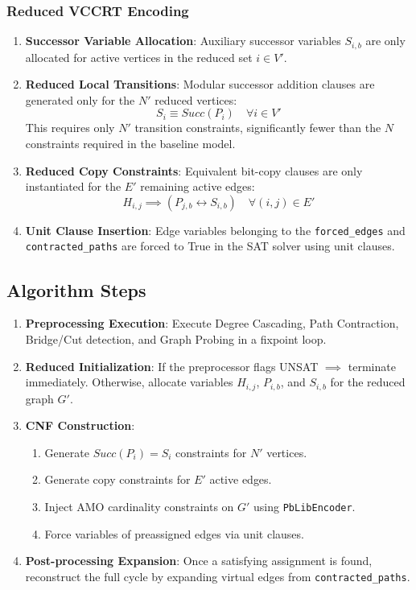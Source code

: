 \subsubsection{Reduced VCCRT Encoding}
\begin{enumerate}
    \item \textbf{Successor Variable Allocation}: Auxiliary successor variables $S_{i,b}$ are only allocated for active vertices in the reduced set $i \in V'$.
    \item \textbf{Reduced Local Transitions}: Modular successor addition clauses are generated only for the $N'$ reduced vertices:
    \begin{equation}
        S_i \equiv Succ(P_i) \quad \forall i \in V'
    \end{equation}
    This requires only $N'$ transition constraints, significantly fewer than the $N$ constraints required in the baseline model.
    \item \textbf{Reduced Copy Constraints}: Equivalent bit-copy clauses are only instantiated for the $E'$ remaining active edges:
    \begin{equation}
        H_{i,j} \implies (P_{j,b} \leftrightarrow S_{i,b}) \quad \forall (i,j) \in E'
    \end{equation}
    \item \textbf{Unit Clause Insertion}: Edge variables belonging to the \texttt{forced\_edges} and \texttt{contracted\_paths} are forced to True in the SAT solver using unit clauses.
\end{enumerate}

\subsection{Algorithm Steps}
\begin{enumerate}
    \item \textbf{Preprocessing Execution}: Execute Degree Cascading, Path Contraction, Bridge/Cut detection, and Graph Probing in a fixpoint loop.
    \item \textbf{Reduced Initialization}: 
    If the preprocessor flags UNSAT $\implies$ terminate immediately.
    Otherwise, allocate variables $H_{i,j}$, $P_{i,b}$, and $S_{i,b}$ for the reduced graph $G'$.
    \item \textbf{CNF Construction}:
    \begin{enumerate}
        \item Generate $Succ(P_i) = S_i$ constraints for $N'$ vertices.
        \item Generate copy constraints for $E'$ active edges.
        \item Inject AMO cardinality constraints on $G'$ using \texttt{PbLibEncoder}.
        \item Force variables of preassigned edges via unit clauses.
    \end{enumerate}
    \item \textbf{Post-processing Expansion}: Once a satisfying assignment is found, reconstruct the full cycle by expanding virtual edges from \texttt{contracted\_paths}.
\end{enumerate}

